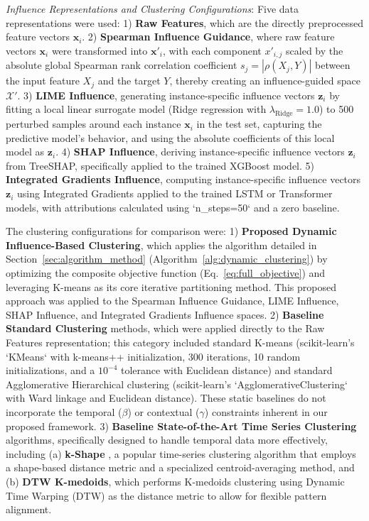 \documentclass[final,authoryear,3p,times,review,sort&compress]{elsarticle}
\newcommand{\vect}[1]{\mathbf{#1}}
\newcommand{\set}[1]{\mathcal{#1}}
\begin{document}
\textit{Influence Representations and Clustering Configurations}:
Five data representations were used: 1) \textbf{Raw Features}, which are the directly preprocessed feature vectors $\vect{x}_i$. 2) \textbf{Spearman Influence Guidance}, where raw feature vectors $\vect{x}_i$ were transformed into $\vect{x}'_i$, with each component $x'_{i,j}$ scaled by the absolute global Spearman rank correlation coefficient $s_j = |\rho(X_j, Y)|$ between the input feature $X_j$ and the target $Y$, thereby creating an influence-guided space $\set{X}'$. 3) \textbf{LIME Influence}, generating instance-specific influence vectors $\vect{z}_i$ by fitting a local linear surrogate model (Ridge regression with $\lambda_{\text{Ridge}}=1.0$) to 500 perturbed samples around each instance $\vect{x}_i$ in the test set, capturing the predictive model's behavior, and using the absolute coefficients of this local model as $\vect{z}_i$. 4) \textbf{SHAP Influence}, deriving instance-specific influence vectors $\vect{z}_i$ from TreeSHAP, specifically applied to the trained XGBoost model. 5) \textbf{Integrated Gradients Influence}, computing instance-specific influence vectors $\vect{z}_i$ using Integrated Gradients applied to the trained LSTM or Transformer models, with attributions calculated using `n\_steps=50` and a zero baseline.

The clustering configurations for comparison were: 1) \textbf{Proposed Dynamic Influence-Based Clustering}, which applies the algorithm detailed in Section~\ref{sec:algorithm_method} (Algorithm~\ref{alg:dynamic_clustering}) by optimizing the composite objective function (Eq.~\ref{eq:full_objective}) and leveraging K-means as its core iterative partitioning method. This proposed approach was applied to the Spearman Influence Guidance, LIME Influence, SHAP Influence, and Integrated Gradients Influence spaces. 2) \textbf{Baseline Standard Clustering} methods, which were applied directly to the Raw Features representation; this category included standard K-means (scikit-learn's `KMeans` with k-means++ initialization, 300 iterations, 10 random initializations, and a $10^{-4}$ tolerance with Euclidean distance) and standard Agglomerative Hierarchical clustering (scikit-learn's `AgglomerativeClustering` with Ward linkage and Euclidean distance). These static baselines do not incorporate the temporal ($\beta$) or contextual ($\gamma$) constraints inherent in our proposed framework. 3) \textbf{Baseline State-of-the-Art Time Series Clustering} algorithms, specifically designed to handle temporal data more effectively, including (a) \textbf{k-Shape} \citep{paparrizos2015k}, a popular time-series clustering algorithm that employs a shape-based distance metric and a specialized centroid-averaging method, and (b) \textbf{DTW K-medoids}, which performs K-medoids clustering using Dynamic Time Warping (DTW) as the distance metric to allow for flexible pattern alignment.
\end{document}
